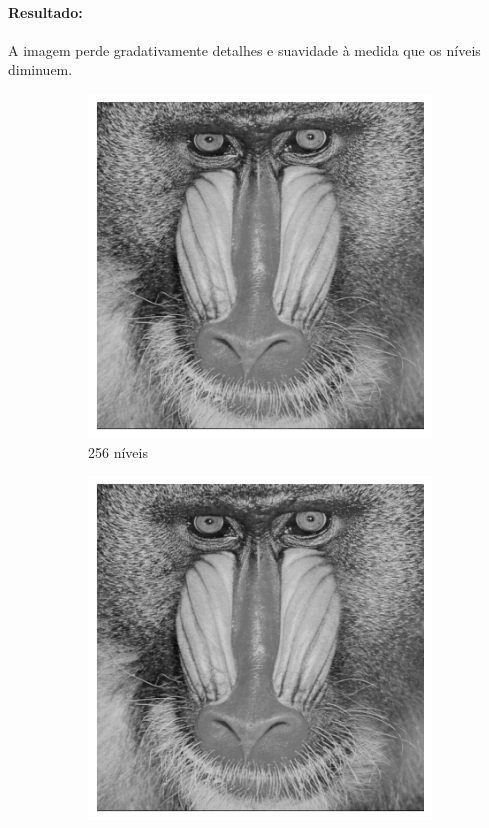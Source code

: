 \documentclass[12pt,a4paper]{report}
\begin{document}
\paragraph{Resultado:} 
A imagem perde gradativamente detalhes e suavidade à medida que os níveis diminuem.
\begin{figure}[H]
  \centering
  \begin{subfigure}{0.3\textwidth}
    \includegraphics[width=\linewidth]{imagens/ex9-1.png}
    \caption{256 níveis}
  \end{subfigure}
 \begin{subfigure}{0.3\textwidth}
    \includegraphics[width=\linewidth]{imagens/ex9-2.png}

\end{subfigure}
\end{figure}
\end{document}
